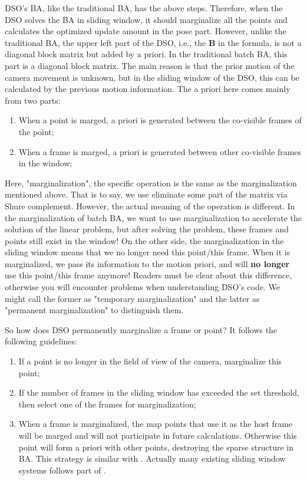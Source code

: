 \documentclass[a4paper,10pt]{article}
\begin{document}
	DSO's BA, like the traditional BA, has the above steps. Therefore, when the DSO solves the BA in sliding window, it should marginalize all the points and calculates the optimized update amount in the pose part. However, unlike the traditional BA, the upper left part of the DSO, i.e., the $\mathbf{B}$ in the formula, is not a diagonal block matrix but added by a priori. In the traditional batch BA, this part is a diagonal block matrix. The main reason is that the prior motion of the camera movement is unknown, but in the sliding window of the DSO, this can be calculated by the previous motion information. The a priori here comes mainly from two parts:
	\begin{enumerate}
	\item When a point is marged, a priori is generated between the co-visible frames of the point;
	\item When a frame is marged, a priori is generated between other co-visible frames in the window;
	\end{enumerate}
	
	Here, "marginalization", the specific operation is the same as the marginalization mentioned above. That is to say, we use eliminate some part of the matrix via Shure complement. However, the actual meaning of the operation is different. In the marginalization of batch BA, we want to use marginalization to accelerate the solution of the linear problem, but after solving the problem, these frames and points still exist in the window! On the other side, the marginalization in the sliding window means that we no longer need this point/this frame. When it is marginalized, we pass its information to the motion priori, and will \textbf{no longer} use this point/this frame anymore! Readers must be clear about this difference, otherwise you will encounter problems when understanding DSO's code. We might call the former as "temporary marginalization" and the latter as "permanent marginalization" to distinguish them.
	
	So how does DSO permanently marginalize a frame or point? It follows the following guidelines:
	\begin{enumerate}
	\item If a point is no longer in the field of view of the camera, marginalize this point;
	\item If the number of frames in the sliding window has exceeded the set threshold, then select one of the frames for marginalization;
	\item When a frame is marginalized, the map points that use it as the host frame will be marged and will not participate in future calculations. Otherwise this point will form a priori with other points, destroying the sparse structure in BA. This strategy is similar with \cite{leutenegger2015keyframe}. Actually many existing sliding window systems follows part of \cite{leutenegger2015keyframe}.
	\end{enumerate}
	
\end{document}
